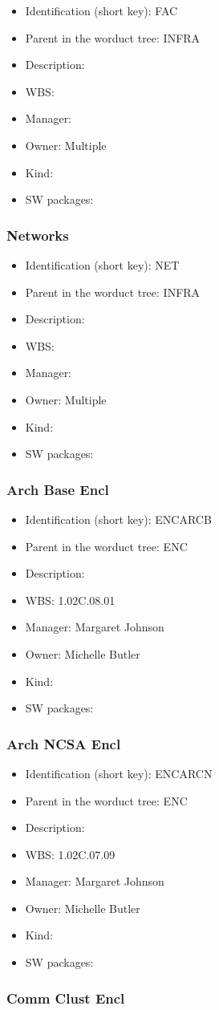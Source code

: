 \begin{itemize}\item Identification (short key): FAC
\item Parent in the worduct tree: INFRA
\item Description: 
\item WBS: 
\item Manager: 
\item Owner: Multiple
\item Kind:
\item SW packages: 
\end{itemize}\subsubsection{Networks}
\begin{itemize}\item Identification (short key): NET
\item Parent in the worduct tree: INFRA
\item Description: 
\item WBS: 
\item Manager: 
\item Owner: Multiple
\item Kind:
\item SW packages: 
\end{itemize}\subsubsection{Arch Base Encl}
\begin{itemize}\item Identification (short key): ENCARCB
\item Parent in the worduct tree: ENC
\item Description: 
\item WBS: 1.02C.08.01
\item Manager: Margaret Johnson
\item Owner: Michelle Butler
\item Kind:
\item SW packages: 
\end{itemize}\subsubsection{Arch NCSA Encl}
\begin{itemize}\item Identification (short key): ENCARCN
\item Parent in the worduct tree: ENC
\item Description: 
\item WBS: 1.02C.07.09
\item Manager: Margaret Johnson
\item Owner: Michelle Butler
\item Kind:
\item SW packages: 
\end{itemize}\subsubsection{Comm Clust Encl}

